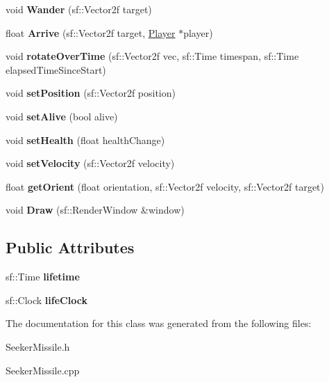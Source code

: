 \begin{DoxyCompactItemize}
void {\bfseries Wander} (sf\+::\+Vector2f target)
\item 
\mbox{\label{class_seeker_missile_afd7d8339af95452635f7ed84373c66b0}} 
float {\bfseries Arrive} (sf\+::\+Vector2f target, \mbox{\hyperlink{class_player}{Player}} $\ast$player)
\item 
\mbox{\label{class_seeker_missile_aa730a51000b8b61385d5725febda4962}} 
void {\bfseries rotate\+Over\+Time} (sf\+::\+Vector2f vec, sf\+::\+Time timespan, sf\+::\+Time elapsed\+Time\+Since\+Start)
\item 
\mbox{\label{class_seeker_missile_a9ab2ce9cc84d0cd47a6be437025dd0d3}} 
void {\bfseries set\+Position} (sf\+::\+Vector2f position)
\item 
\mbox{\label{class_seeker_missile_ac0d126a95002d312305b51f3625a728b}} 
void {\bfseries set\+Alive} (bool alive)
\item 
\mbox{\label{class_seeker_missile_abdafa685dda98c78488c54629d427d58}} 
void {\bfseries set\+Health} (float health\+Change)
\item 
\mbox{\label{class_seeker_missile_a9621e4dca70af019f083681c6ee1d6c2}} 
void {\bfseries set\+Velocity} (sf\+::\+Vector2f velocity)
\item 
\mbox{\label{class_seeker_missile_acb47a64a571ad9660ebe47ebd1595d20}} 
float {\bfseries get\+Orient} (float orientation, sf\+::\+Vector2f velocity, sf\+::\+Vector2f target)
\item 
\mbox{\label{class_seeker_missile_a8744918a81a590920c2555ac68dac04c}} 
void {\bfseries Draw} (sf\+::\+Render\+Window \&window)
\end{DoxyCompactItemize}
\subsection*{Public Attributes}
\begin{DoxyCompactItemize}
\item 
\mbox{\label{class_seeker_missile_a22f333589b0567df4a2442f892a4e530}} 
sf\+::\+Time {\bfseries lifetime}
\item 
\mbox{\label{class_seeker_missile_a1c589b64ef67acfb3881c80067edcd4a}} 
sf\+::\+Clock {\bfseries life\+Clock}
\end{DoxyCompactItemize}


The documentation for this class was generated from the following files\+:\begin{DoxyCompactItemize}
\item 
Seeker\+Missile.\+h\item 
Seeker\+Missile.\+cpp\end{DoxyCompactItemize}
